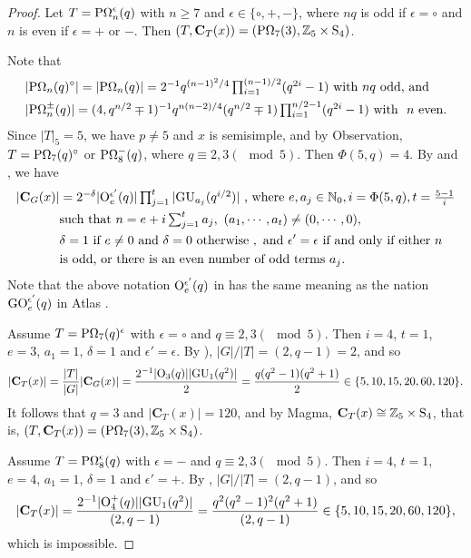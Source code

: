 \documentclass[12pt,reqno]{amsart}
\def\C{\mathbf{C}}   \newcommand\Cay{\mathrm{Cay}}   \newcommand\Cos{\mathrm{Cos}} \newcommand{\CGammaSp}{\mathrm{C\Gamma Sp}}
\numberwithin {equation} {section}
\begin{document}
\begin{proof}
\smallskip

 Let $T=\mathrm{P\Omega}^{\epsilon}_n(q)$ with $n \geq 7$ and $\epsilon \in \{ \circ,+,-\}$, where $nq$ is odd if $\epsilon=\circ$ and $n$ is even if $\epsilon=+$ or $-$. Then  $(T,\C_T(x))=(\POmega_7(3),\ZZ_5 \times\Sy_4)$. \label{PO7}

Note that
\[
\begin{split}
&|\mathrm{P\Omega}_{n}(q)^\circ|=|\mathrm{P\Omega}_{n}(q)|=\textstyle{2^{-1}q^{ (n-1)^2/4}\prod_{i=1}^{(n-1)/2} (q^{2i}-1)} \text{~with~} nq \text{~odd,~and} \\
&|\mathrm{P\Omega}_{n}^{\pm}(q)| =\textstyle{(4,q^{n/2} \mp 1)^{-1}q^{n(n-2)/4}(q^{n/2} \mp 1)\prod_{i=1}^{n/2-1}(q^{2i}-1)} \text{~with ~} n \text{~even}.
\end{split}
 \]
 Since $|T|_5=5$, we have  $p \neq 5$ and $x$ is semisimple, and by Observation, $T=\mathrm{P\Omega}_7(q)^\circ$ or $\mathrm{P\Omega}_8^{-}(q)$, where  $q \equiv 2,3(\mod 5)$.   Then $\Phi(5,q)=4$. By \cite[Table B.12]{B-G} and \cite[Proposition 3.5.4 (ii)]{B-G}, we have
 \begin{equation}\label{eq:po}
 \begin{split}
 \textstyle |\C_G(x)|&  =\textstyle{2^{-\delta} |\O^{\epsilon'}_e(q)|\prod_{j=1}^{t}|\GU_{a_j}(q^{i/2})|}  ~\text{,~where~} e,a_j \in \mathbb{N}_0, i=\Phi(5,q),   \textstyle{t=\frac{5-1}{i}}\\
  & \text{such~that~} \textstyle{n=e+i\sum_{j=1}^{t}a_j},\ (a_1,\cdots,a_t) \neq (0,\cdots,0), \\
  & \delta= 1 \text{~if~} e \neq 0  \text{~and~} \delta= 0 \text{~otherwise~}, \text{~and~}\epsilon' = \epsilon \text{~if and only if either~}  n   \\
  & \text{is~odd,} \text{~or~} \text{there~is~an~even~number~of~odd~terms~}a_j.\\
\end{split}
 \end{equation}
Note that the above notation $\mathrm{O}^{\epsilon'}_e(q)$ in \cite[Section 2.5]{B-G} has the same meaning as the nation $\mathrm{GO}^{\epsilon'}_e(q)$ in Atlas \cite[Chapter 2: Section 4]{Atlas}.

Assume $T=\mathrm{P\Omega}_7(q)^\epsilon$ with $\epsilon=\circ$ and $q \equiv 2,3(\mod 5)$. Then $i=4$, $t=1$, $e=3$, $a_1=1$, $\delta=1$ and $\epsilon'=\epsilon$. By \cite[Theorem 2.5.12 (c)]{CFSG}),  $|G|/|T|=(2,q-1)=2$, and so
\[ |\C_T(x)|=\frac{|T|}{|G|}|\C_G(x)|=\frac{2^{-1}|\O_3(q)||\GU_1(q^2)|}{2}=\frac{q(q^2-1)(q^2+1)}{2} \in \{5,10,15,20,60,120 \}.\]
It follows that $q=3$ and $|\C_T(x)|=120$, and by {\sc Magma}, $\C_T(x) \cong \ZZ_5 \times\Sy_4$, that is, $(T,\C_T(x))=(\POmega_7(3),\ZZ_5 \times\Sy_4)$.

Assume $T=\mathrm{P\Omega}_8^{\epsilon}(q)$ with $\epsilon=-$ and $q \equiv 2,3(\mod 5)$. Then  $i=4$, $t=1$,
$e=4$, $a_1=1$, $\delta=1$ and $\epsilon'=+$. By \cite[Theorem 2.5.12 (c)]{CFSG}, $|G|/|T|=(2,q-1)$, and so
\[ |\C_T(x)|=\frac{2^{-1}|\O_4^{+}(q)||\GU_1(q^2)|}{(2,q-1)}=\frac{q^2(q^2-1)^2(q^2+1)}{(2,q-1)}\in \{5,10,15,20,60,120 \},\]
which is impossible.
\end{proof}
\end{document}
